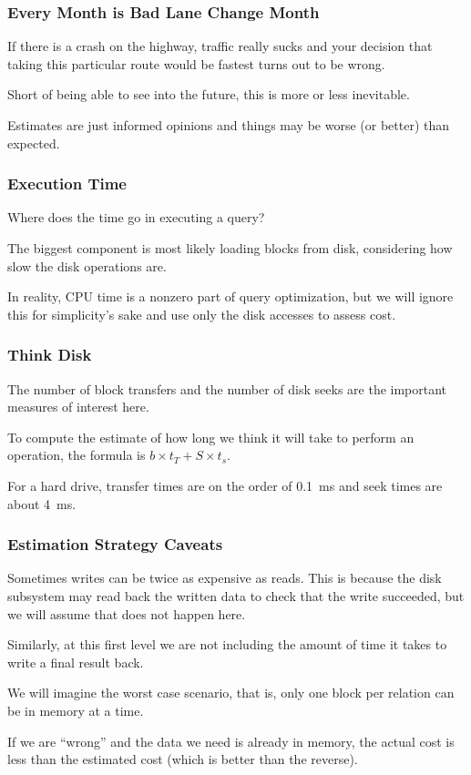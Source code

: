 \begin{frame}
\frametitle{Every Month is Bad Lane Change Month}

If there is a crash on the highway, traffic really sucks and your decision that taking this particular route would be fastest turns out to be wrong. 

Short of being able to see into the future, this is more or less inevitable.

Estimates are just informed opinions and things may be worse (or better) than expected. 

\end{frame}

\begin{frame}
\frametitle{Execution Time}

Where does the time go in executing a query? 

The biggest component is most likely loading blocks from disk, considering how slow the disk operations are. 

In reality, CPU time is a nonzero part of query optimization, but we will ignore this for simplicity's sake and use only the disk accesses to assess cost.

\end{frame}

\begin{frame}
\frametitle{Think Disk}

The number of block transfers and the number of disk seeks are the important measures of interest here.
 
To compute the estimate of how long we think it will take to perform an operation, the formula is $b \times t_{T} + S \times t_{s}$. 

For a hard drive, transfer times are on the order of 0.1~ms and seek times are about 4~ms.

\end{frame}

\begin{frame}
\frametitle{Estimation Strategy Caveats}

Sometimes writes can be twice as expensive as reads. This is because the disk subsystem may read back the written data to check that the write succeeded, but we will assume that does not happen here. 

Similarly, at this first level we are not including the amount of time it takes to write a final result back. 

We will imagine the worst case scenario, that is, only one block per relation can be in memory at a time. 

If we are ``wrong'' and the data we need is already in memory, the actual cost is less than the estimated cost (which is better than the reverse). 

\end{frame}



